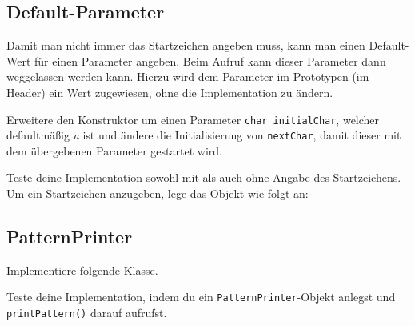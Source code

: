 
\subsection{Default-Parameter}
Damit man nicht immer das Startzeichen angeben muss, kann man einen Default-Wert für einen Parameter angeben. Beim Aufruf kann dieser Parameter dann weggelassen werden kann.
Hierzu wird dem Parameter im Prototypen (im Header) ein Wert zugewiesen, ohne die Implementation zu ändern.


Erweitere den Konstruktor um einen Parameter \lstinline{char initialChar}, welcher defaultmäßig \emph{a} ist und ändere die Initialisierung von \lstinline{nextChar}, damit dieser mit dem übergebenen Parameter gestartet wird.

Teste deine Implementation sowohl mit als auch ohne Angabe des Startzeichens.
Um ein Startzeichen anzugeben, lege das Objekt wie folgt an:



\subsection{PatternPrinter}
Implementiere folgende Klasse.


Teste deine Implementation, indem du ein \lstinline{PatternPrinter}-Objekt anlegst und \lstinline{printPattern()} darauf aufrufst.

